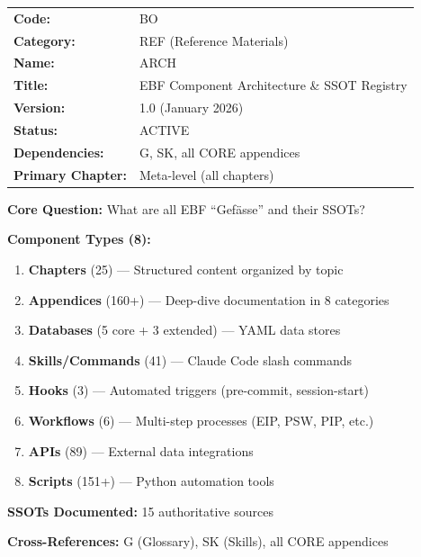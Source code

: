 \begin{tcolorbox}[colback=gray!5!white, colframe=gray!75!black,
    title=Appendix Metadata]
\begin{tabular}{@{}ll@{}}
\textbf{Code:} & BO \\
\textbf{Category:} & REF (Reference Materials) \\
\textbf{Name:} & ARCH \\
\textbf{Title:} & EBF Component Architecture \& SSOT Registry \\
\textbf{Version:} & 1.0 (January 2026) \\
\textbf{Status:} & ACTIVE \\
\textbf{Dependencies:} & G, SK, all CORE appendices \\
\textbf{Primary Chapter:} & Meta-level (all chapters) \\
\end{tabular}
\end{tcolorbox}


\begin{tcolorbox}[colback=blue!5!white, colframe=blue!75!black,
    title=Quick Reference: EBF Component Architecture]

\textbf{Core Question:} What are all EBF ``Gefässe'' and their SSOTs?

\textbf{Component Types (8):}
\begin{enumerate}[nosep]
\item \textbf{Chapters} (25) --- Structured content organized by topic
\item \textbf{Appendices} (160+) --- Deep-dive documentation in 8 categories
\item \textbf{Databases} (5 core + 3 extended) --- YAML data stores
\item \textbf{Skills/Commands} (41) --- Claude Code slash commands
\item \textbf{Hooks} (3) --- Automated triggers (pre-commit, session-start)
\item \textbf{Workflows} (6) --- Multi-step processes (EIP, PSW, PIP, etc.)
\item \textbf{APIs} (89) --- External data integrations
\item \textbf{Scripts} (151+) --- Python automation tools
\end{enumerate}

\textbf{SSOTs Documented:} 15 authoritative sources

\textbf{Cross-References:} G (Glossary), SK (Skills), all CORE appendices

\end{tcolorbox}

